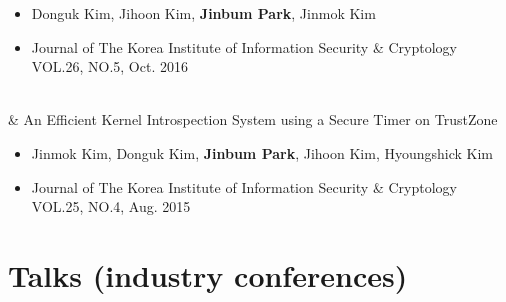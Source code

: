 \documentclass[10pt, a4paper]{article}
\newcommand{\Year}[1]{\fontsize{9pt}{0}\selectfont #1}
\begin{document}
\begin{EntriesTable}
\begin{itemize}
    \item Donguk Kim, Jihoon Kim, \textbf{Jinbum Park}, Jinmok Kim
    \item Journal of The Korea Institute of Information Security \& Cryptology VOL.26, NO.5, Oct. 2016
  \end{itemize}
  \\
  \Year{2015} &
  An Efficient Kernel Introspection System using a Secure Timer on TrustZone
  \begin{itemize}
    \item Jinmok Kim, Donguk Kim, \textbf{Jinbum Park}, Jihoon Kim, Hyoungshick Kim
    \item Journal of The Korea Institute of Information Security \& Cryptology VOL.25, NO.4, Aug. 2015
  \end{itemize}

\end{EntriesTable}

\section{Talks (industry conferences)}
\end{document}
